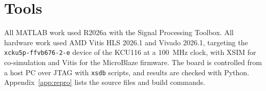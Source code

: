 \section{Tools}

All MATLAB work used R2026a with the Signal Processing Toolbox. All hardware
work used AMD Vitis HLS 2026.1 and Vivado 2026.1, targeting the
\texttt{xcku5p-ffvb676-2-e} device of the KCU116 at a \SI{100}{\mega\hertz}
clock, with XSIM for co-simulation and Vitis for the MicroBlaze firmware. The
board is controlled from a host PC over JTAG with \texttt{xsdb} scripts, and
results are checked with Python. Appendix~\ref{app:repro} lists the source
files and build commands.
